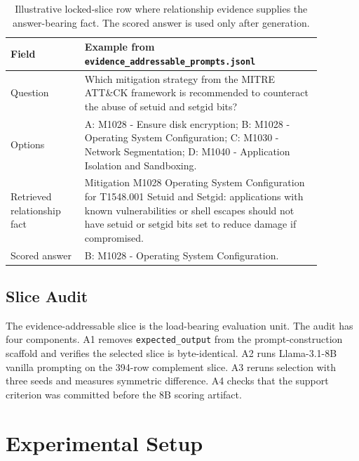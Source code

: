 \documentclass[10pt]{article}
\begin{document}
\begin{table}[H]
  \centering
  \caption{Illustrative locked-slice row where relationship evidence supplies the answer-bearing fact. The scored answer is used only after generation.}
  \label{tab:example-row}
  \footnotesize
  \setlength{\tabcolsep}{4pt}
  \begin{tabular}{p{0.21\linewidth}p{0.67\linewidth}}
    \toprule
    Field & Example from \texttt{evidence\_addressable\_prompts.jsonl} \\
    \midrule
    Question & Which mitigation strategy from the MITRE ATT\&CK framework is recommended to counteract the abuse of setuid and setgid bits? \\
    Options & A: M1028 - Ensure disk encryption; B: M1028 - Operating System Configuration; C: M1030 - Network Segmentation; D: M1040 - Application Isolation and Sandboxing. \\
    Retrieved relationship fact & Mitigation M1028 Operating System Configuration for T1548.001 Setuid and Setgid: applications with known vulnerabilities or shell escapes should not have setuid or setgid bits set to reduce damage if compromised. \\
    Scored answer & B: M1028 - Operating System Configuration. \\
    \bottomrule
  \end{tabular}
\end{table}

\subsection{Slice Audit}

The evidence-addressable slice is the load-bearing evaluation unit.
The audit has four components.
A1 removes \texttt{expected\_output} from the prompt-construction scaffold and verifies the selected slice is byte-identical.
A2 runs Llama-3.1-8B vanilla prompting on the 394-row complement slice.
A3 reruns selection with three seeds and measures symmetric difference.
A4 checks that the support criterion was committed before the 8B scoring artifact.

\section{Experimental Setup}
\end{document}
